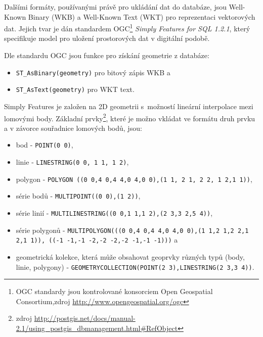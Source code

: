 Dalšími formáty, používanými právě pro ukládání dat do databáze, jsou Well-Known Binary (WKB) a Well-Known Text (WKT) pro reprezentaci vektorových dat. Jejich tvar je dán standardem OGC\footnote{OGC standardy jsou kontrolované konsorciem Open Geospatial Consortium,\newline zdroj \url{http://www.opengeospatial.org/ogc}} {\it Simply Features for SQL 1.2.1}, který specifikuje model pro uložení prostorových dat v digitální podobě. 

Dle standardu OGC jsou funkce pro získání geometrie z databáze:
\begin{itemize}
\item \texttt{ST\_AsBinary(geometry)} pro bitový zápis WKB a
\item \texttt{ST\_AsText(geometry)} pro WKT text.
     \end{itemize}

Simply Features je založen na 2D geometrii s~možností lineární interpolace mezi lomovými body. Základní prvky\footnote{zdroj \url {http://postgis.net/docs/manual-2.1/using\_postgis\_dbmanagement.html\#RefObject}}, které je možno vkládat ve formátu druh prvku a v závorce souřadnice lomových bodů, jsou:
\begin{itemize}
\item bod - \texttt{POINT(0 0)},
\item linie - \texttt{LINESTRING(0 0, 1 1, 1 2)},
\item polygon - \texttt{POLYGON ((0 0,4 0,4 4,0 4,0 0),(1 1, 2 1, 2 2, 1 2,1 1))},
\item série bodů - \texttt{MULTIPOINT((0 0),(1 2))},
\item série linií - \texttt{MULTILINESTRING((0 0,1 1,1 2),(2 3,3 2,5 4))},
\item série polygonů - \texttt{MULTIPOLYGON(((0 0,4 0,4 4,0 4,0 0),(1 1,2 1,2 2,1 2,1 1)), ((-1 -1,-1 -2,-2 -2,-2 -1,-1 -1)))} a
\item geometrická kolekce, která může obsahovat geoprvky různých typů (body, linie, polygony) - \texttt{GEOMETRYCOLLECTION(POINT(2 3),LINESTRING(2 3,3 4))}.
\end{itemize}

